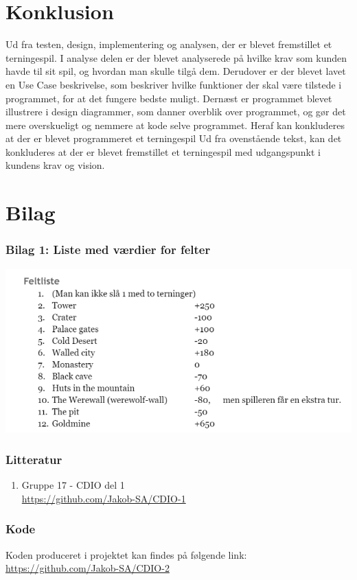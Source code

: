 \documentclass{article}
\begin{document}
\section{Konklusion}
Ud fra testen, design, implementering og analysen, der er blevet fremstillet et terningespil. I analyse delen  er der blevet analyserede på hvilke krav som kunden havde til sit spil, og hvordan man skulle tilgå dem. Derudover er der blevet lavet en Use Case beskrivelse, som beskriver hvilke funktioner der skal være tilstede i programmet, for at det fungere bedste muligt. Dernæst er programmet blevet illustrere i design diagrammer, som danner overblik over programmet, og gør det mere overskueligt og nemmere at kode selve programmet. 
Heraf kan konkluderes at der er blevet programmeret et terningespil Ud fra ovenstående tekst, kan det konkluderes at der er blevet fremstillet et terningespil med udgangspunkt i kundens krav og vision.

\section{Bilag}
\subsubsection{Bilag 1: Liste med værdier for felter}

    \centering
    \includegraphics[scale=0.7]{Billeder/Bilag1Feltliste.png}
    \label{fig:Bilag1}

\subsubsection{Litteratur}
\begin{enumerate}
    \item Gruppe 17 - CDIO del 1 \\
    \href{https://github.com/Jakob-SA/CDIO-1}{https://github.com/Jakob-SA/CDIO-1}
\end{enumerate}

\subsubsection{Kode}
Koden produceret i projektet kan findes på følgende link: \href{https://github.com/Jakob-SA/CDIO-2}{https://github.com/Jakob-SA/CDIO-2}
\end{document}
